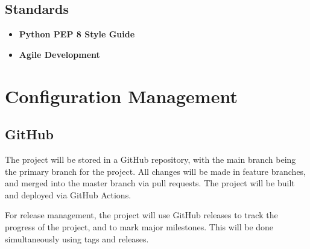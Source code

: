 \documentclass[12pt]{article}
\begin{document}
\subsection{Standards}
\begin{itemize}
    \item \textbf{Python PEP 8 Style Guide}
    \item \textbf{Agile Development}
\end{itemize}

\section{Configuration Management}

\subsection{GitHub}
The project will be stored in a GitHub repository, with the main branch being the primary branch for the project. All changes will be made in feature branches, and merged into the master branch via pull requests. The project will be built and deployed via GitHub Actions.

For release management, the project will use GitHub releases to track the progress of the project, and to mark major milestones. This will be done simultaneously using tags and releases.
\end{document}
